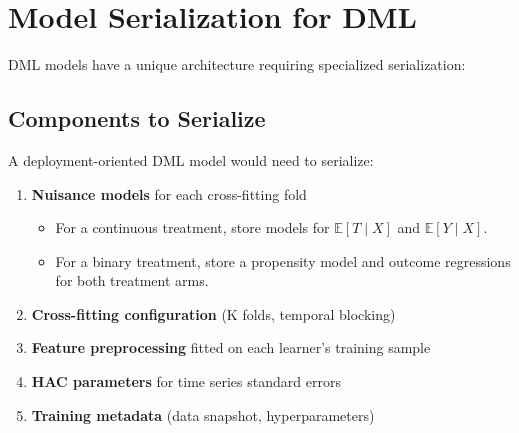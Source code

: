 \section{Model Serialization for DML}\label{sec:model_serialization}

DML models have a unique architecture requiring specialized serialization:

\subsection{Components to Serialize}

A deployment-oriented DML model would need to serialize:

\begin{enumerate}
    \item \textbf{Nuisance models} for each cross-fitting fold
    \begin{itemize}
        \item For a continuous treatment, store models for $\mathbb{E}[T\mid X]$ and $\mathbb{E}[Y\mid X]$.
        \item For a binary treatment, store a propensity model and outcome regressions for both treatment arms.
    \end{itemize}
    \item \textbf{Cross-fitting configuration} (K folds, temporal blocking)
    \item \textbf{Feature preprocessing} fitted on each learner's training sample
    \item \textbf{HAC parameters} for time series standard errors
    \item \textbf{Training metadata} (data snapshot, hyperparameters)
\end{enumerate}

